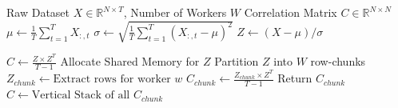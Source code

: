 \begin{minipage}{0.95\textwidth}
    \begin{algorithm}[H]
        \caption{Baseline CPU Correlation (Serial \& Multiprocessing)}
        \label{alg:baseline_cpu}
        \begin{algorithmic}[1]
        \Require Raw Dataset $X \in \mathbb{R}^{N \times T}$, Number of Workers $W$
        \Ensure Correlation Matrix $C \in \mathbb{R}^{N \times N}$
            \State $\mu \gets \frac{1}{T} \sum_{t=1}^{T} X_{:,t}$ 
            \State $\sigma \gets \sqrt{\frac{1}{T} \sum_{t=1}^{T} (X_{:,t} - \mu)^2}$ 
            \State $Z \gets (X - \mu) / \sigma$ 
            
             
                \State $C \gets \frac{Z \times Z^T}{T-1}$ 
            \Else {}
                \State Allocate Shared Memory for $Z$
                \State Partition $Z$ into $W$ row-chunks
                    \State $Z_{chunk} \gets \text{Extract rows for worker } w$
                    \State $C_{chunk} \gets \frac{Z_{chunk} \times Z^T}{T-1}$ 
                    \State Return $C_{chunk}$
                \EndFor
                \State $C \gets \text{Vertical Stack of all } C_{chunk}$
            \EndIf
        \end{algorithmic}
    \end{algorithm}
\end{minipage}

\vspace{0.5cm}

